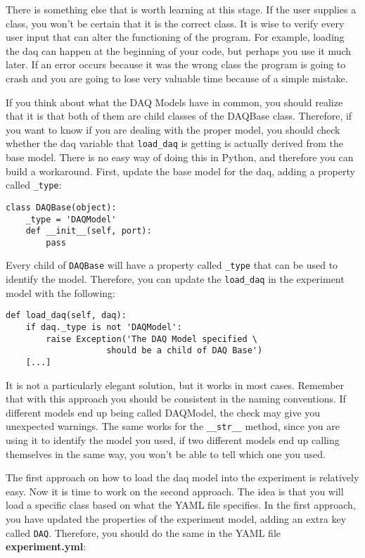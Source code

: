There is something else that is worth learning at this stage. If the
user supplies a class, you won't be certain that it is the correct
class. It is wise to verify every user input that can alter the
functioning of the program. For example, loading the daq can happen at
the beginning of your code, but perhaps you use it much later. If an
error occurs because it was the wrong class the program is going to
crash and you are going to lose very valuable time because of a
simple mistake.

If you think about what the {DAQ} Models have in common, you should
realize that it is that both of them are child classes of the DAQBase
class. Therefore, if you want to know if you are dealing with the proper
model, you should check whether the daq variable that \texttt{load_daq}
is getting is actually derived from the base model. There is no easy way
of doing this in Python, and therefore you can build a workaround.
First, update the base model for the daq, adding a property called
\texttt{_type}:

\begin{verbatim}
class DAQBase(object):
    _type = 'DAQModel'
    def __init__(self, port):
        pass
\end{verbatim}

Every child of \texttt{DAQBase} will have a property called
\texttt{_type} that can be used to identify the model. Therefore, you
can update the \texttt{load_daq} in the experiment model with
the following:

\begin{verbatim}
def load_daq(self, daq):
    if daq._type is not 'DAQModel':
        raise Exception('The DAQ Model specified \
                    should be a child of DAQ Base')
    [...]
\end{verbatim}

It is not a particularly elegant solution, but it works in most cases.
Remember that with this approach you should be consistent in the naming
conventions. If different models end up being called DAQModel, the check
may give you unexpected warnings. The same works for the
\texttt{__str__} method, since you are using it to identify the
model you used, if two different models end up calling themselves in the
same way, you won't be able to tell which one you used.

The first approach on how to load the daq model into the experiment is
relatively easy. Now it is time to work on the second approach. The idea
is that you will load a specific class based on what the {YAML} file
specifies. In the first approach, you have updated the properties of the
experiment model, adding an extra key called \texttt{DAQ}. Therefore,
you should do the same in the {YAML} file \textbf{experiment.yml}:

